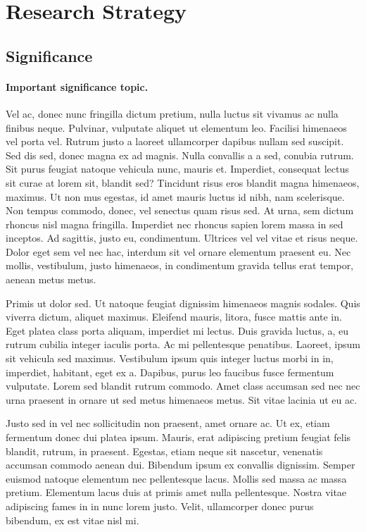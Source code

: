 \documentclass[11pt,]{article}
\title{}
\author{}
\date{}
\begin{document}
\hypertarget{research-strategy}{%
\section{Research Strategy}\label{research-strategy}}

\hypertarget{significance}{%
\subsection{Significance}\label{significance}}

\hypertarget{important-significance-topic.}{%
\paragraph{Important significance
topic.}\label{important-significance-topic.}}

Vel ac, donec nunc fringilla dictum pretium, nulla luctus sit vivamus ac
nulla finibus neque. Pulvinar, vulputate aliquet ut elementum leo.
Facilisi himenaeos vel porta vel. Rutrum justo a laoreet ullamcorper
dapibus nullam sed suscipit. Sed dis sed, donec magna ex ad magnis.
Nulla convallis a a sed, conubia rutrum. Sit purus feugiat natoque
vehicula nunc, mauris et. Imperdiet, consequat lectus sit curae at lorem
sit, blandit sed? Tincidunt risus eros blandit magna himenaeos, maximus.
Ut non mus egestas, id amet mauris luctus id nibh, nam scelerisque. Non
tempus commodo, donec, vel senectus quam risus sed. At urna, sem dictum
rhoncus nisl magna fringilla. Imperdiet nec rhoncus sapien lorem massa
in sed inceptos. Ad sagittis, justo eu, condimentum. Ultrices vel vel
vitae et risus neque. Dolor eget sem vel nec hac, interdum sit vel
ornare elementum praesent eu. Nec mollis, vestibulum, justo himenaeos,
in condimentum gravida tellus erat tempor, aenean metus metus.

Primis ut dolor sed. Ut natoque feugiat dignissim himenaeos magnis
sodales. Quis viverra dictum, aliquet maximus. Eleifend mauris, litora,
fusce mattis ante in. Eget platea class porta aliquam, imperdiet mi
lectus. Duis gravida luctus, a, eu rutrum cubilia integer iaculis porta.
Ac mi pellentesque penatibus. Laoreet, ipsum sit vehicula sed maximus.
Vestibulum ipsum quis integer luctus morbi in in, imperdiet, habitant,
eget ex a. Dapibus, purus leo faucibus fusce fermentum vulputate. Lorem
sed blandit rutrum commodo. Amet class accumsan sed nec nec urna
praesent in ornare ut sed metus himenaeos metus. Sit vitae lacinia ut eu
ac.

Justo sed in vel nec sollicitudin non praesent, amet ornare ac. Ut ex,
etiam fermentum donec dui platea ipsum. Mauris, erat adipiscing pretium
feugiat felis blandit, rutrum, in praesent. Egestas, etiam neque sit
nascetur, venenatis accumsan commodo aenean dui. Bibendum ipsum ex
convallis dignissim. Semper euismod natoque elementum nec pellentesque
lacus. Mollis sed massa ac massa pretium. Elementum lacus duis at primis
amet nulla pellentesque. Nostra vitae adipiscing fames in in nunc lorem
justo. Velit, ullamcorper donec purus bibendum, ex est vitae nisl mi.
\end{document}
